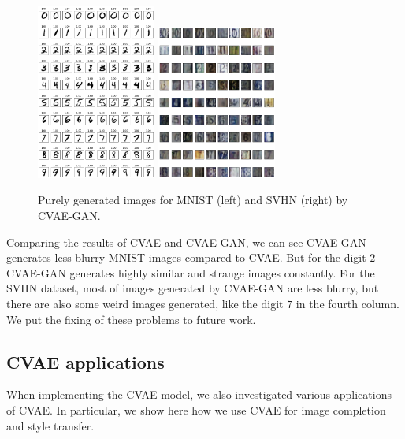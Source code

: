 \documentclass[10pt]{article}
\begin{document}
\begin{figure}[!ht] 
\centering
\includegraphics[width=0.35\textwidth]{images/cvaegan-mnist.png}
\includegraphics[width=0.35\textwidth]{images/cvaegan-svhn.png}
\caption{Purely generated images for MNIST (left) and SVHN (right) by CVAE-GAN.}
\label{figure:cvaegan_label}
\end{figure}
Comparing the results of CVAE and CVAE-GAN, we can see CVAE-GAN generates less blurry MNIST images compared to CVAE. But for the digit $2$ CVAE-GAN generates highly similar and strange images constantly. For the SVHN dataset, most of images generated by CVAE-GAN are less blurry, but there are also some weird images generated, like the digit $7$ in the fourth column. We put the fixing of these problems to future work. 
\subsection{CVAE applications}\label{sub:cvae_app}

When implementing the CVAE model, we also investigated various applications of CVAE. In particular, we show here how we use CVAE for image completion and style transfer.
\end{document}
